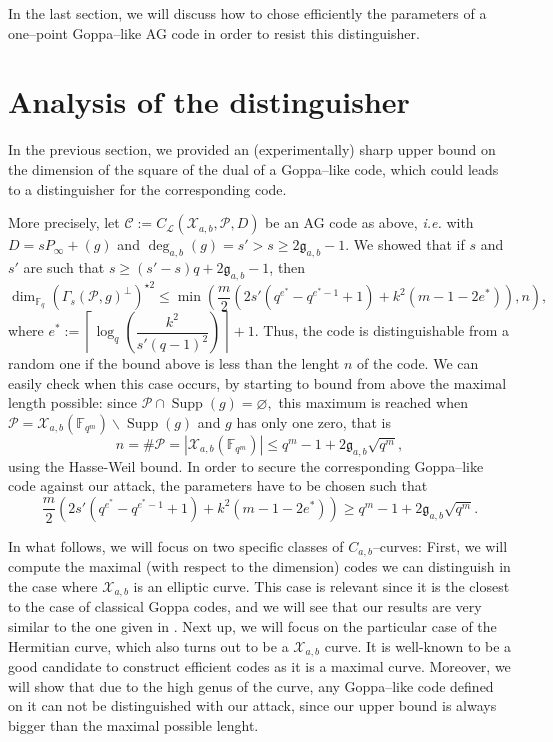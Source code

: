 \documentclass[a4paper]{article}
\theoremstyle{definition}
\theoremstyle{remark}
\newcommand{\calP}{\mathcal{P}}
\newcommand{\calL}{\mathcal{L}}
\newcommand{\calC}{\mathcal{C}}
\newcommand{\calX}{\mathcal{X}}
\newcommand{\fqm}{\mathbb{F}_{q^m}}
\newcommand{\fq}{\mathbb{F}_{q}}
\newcommand{\Supp}{\operatorname{Supp}}
\newcommand{\degab}[1]{\deg_{a,b}\left(#1\right)}
\begin{document}
In the last section, we will discuss how to chose efficiently the parameters of a one--point Goppa--like AG code in order to resist this distinguisher.

\section{Analysis of the distinguisher}

\noindent In the previous section, we provided an (experimentally) sharp upper bound on the dimension of the square of the dual of a Goppa--like code, which could leads to a distinguisher for the corresponding code. 

\noindent More precisely, let $\calC := C_\calL(\calX_{a,b},\calP,D)$ be an AG code as above, \emph{i.e.} with $D = sP_\infty +(g)$ and $\degab{g} = s'>s\geq 2\mathfrak{g}_{a,b}-1$. We showed that if $s$ and $s'$ are such that $s \geq (s'-s)q+2\mathfrak{g}_{a,b}-1$, then
\begin{equation} \label{eq:best_upper_bound}
\dim_{\fq} (\Gamma_s(\calP,g)^{\perp})^{\star 2} \leq \min \left(\frac{m}{2}\left(2s'(q^{e^*}-q^{e^*-1}+1)+k^2(m-1-2e^*)  \right),n\right),
\end{equation}
where $e^* := \left\lceil \log_q\left(\dfrac{k^2}{s'(q-1)^2}\right)\right\rceil+1$. Thus, the code is distinguishable from a random one if the bound above is less than the lenght $n$ of the code. We can easily check when this case occurs, by starting to bound from above the maximal length possible: since $\calP \cap \Supp(g) = \varnothing,$ this maximum is reached when $\calP = \calX_{a,b}(\fqm) \backslash \Supp(g)$ and $g$ has only one zero, that is
$$n = \# \calP = |\calX_{a,b}(\fqm)| \leq q^m-1+2\mathfrak{g}_{a,b}\sqrt{q^m},$$
using the Hasse-Weil bound. In order to secure the corresponding Goppa--like code against our attack, the parameters have to be chosen such that 
\begin{equation} \label{eq:cond_not_to_distinguish}
\frac{m}{2}\left(2s'(q^{e^*}-q^{e^*-1}+1)+k^2(m-1-2e^*)  \right)\geq q^m-1+2\mathfrak{g}_{a,b}\sqrt{q^m}.
\end{equation}

\noindent In what follows, we will focus on two specific classes of $C_{a,b}$--curves: First, we will compute the maximal (with respect to the dimension) codes we can distinguish in the case where $\calX_{a,b}$ is an elliptic curve. This case is relevant since it is the closest to the case of classical Goppa codes, and we will see that our results are very similar to the one given in \cite{MT21}. Next up, we will focus on the particular case of the Hermitian curve, which also turns out to be a $\calX_{a,b}$ curve. It is well-known to be a good candidate to construct efficient codes as it is a maximal curve. Moreover, we will show that due to the high genus of the curve, any Goppa--like code defined on it can not be distinguished with our attack, since our upper bound is always bigger than the maximal possible lenght.
\end{document}

